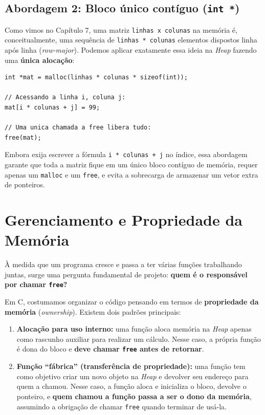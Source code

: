 \subsection{Abordagem 2: Bloco único contíguo (\texttt{int *})}

Como vimos no Capítulo 7, uma matriz \texttt{linhas x colunas} na memória é, conceitualmente, uma sequência de \texttt{linhas * colunas} elementos dispostos linha após linha (\textit{row-major}). Podemos aplicar exatamente essa ideia na \textit{Heap} fazendo uma \textbf{única alocação}:

\begin{lstlisting}
int *mat = malloc(linhas * colunas * sizeof(int));

// Acessando a linha i, coluna j:
mat[i * colunas + j] = 99;

// Uma unica chamada a free libera tudo:
free(mat);
\end{lstlisting}

Embora exija escrever a fórmula \texttt{i * colunas + j} no índice, essa abordagem garante que toda a matriz fique em um único bloco contíguo de memória, requer apenas um \texttt{malloc} e um \texttt{free}, e evita a sobrecarga de armazenar um vetor extra de ponteiros.

\section{Gerenciamento e Propriedade da Memória}
\label{sec:propriedade-memoria}

À medida que um programa cresce e passa a ter várias funções trabalhando juntas, surge uma pergunta fundamental de projeto: \textbf{quem é o responsável por chamar \texttt{free}?}

Em C, costumamos organizar o código pensando em termos de \textbf{propriedade da memória} (\textit{ownership}). Existem dois padrões principais:

\begin{enumerate}
    \item \textbf{Alocação para uso interno:} uma função aloca memória na \textit{Heap} apenas como rascunho auxiliar para realizar um cálculo. Nesse caso, a própria função é dona do bloco e \textbf{deve chamar \texttt{free} antes de retornar}.
    \item \textbf{Função ``fábrica'' (transferência de propriedade):} uma função tem como objetivo criar um novo objeto na \textit{Heap} e devolver seu endereço para quem a chamou. Nesse caso, a função aloca e inicializa o bloco, devolve o ponteiro, e \textbf{quem chamou a função passa a ser o dono da memória}, assumindo a obrigação de chamar \texttt{free} quando terminar de usá-la.
\end{enumerate}

